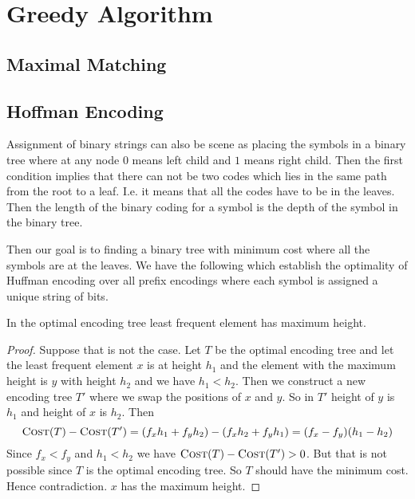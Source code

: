 \chapter{Greedy Algorithm}

\section{Maximal Matching}

\section{Hoffman Encoding}
\begin{algoprob}
\end{algoprob}

Assignment of binary strings can also be scene as placing the symbols in a binary tree where at any node $0$ means left child and $1$ means right child. Then the first condition implies that there can not be two codes which lies in the same path from the root to a leaf. I.e. it means that all the codes have to be in the leaves. Then the length of the binary coding for a symbol  is the depth of the symbol in the binary tree. 

Then our goal is to finding a binary tree with minimum cost where all the symbols are at the leaves. We have the following which establish the optimality of Huffman encoding over all prefix encodings where each symbol is assigned a unique string of bits.
\begin{lemma}{}{}
	In the optimal encoding tree  least frequent element has maximum height.
\end{lemma}
\begin{proof}
	Suppose that is not the case. Let $T$ be the optimal encoding tree and let the least frequent element $x$ is at height $h_1$ and the element with the maximum height is $y$ with height $h_2$ and we have $h_1<h_2$.  Then we construct a new encoding tree $T'$ where we swap the positions of $x$ and $y$. So in $T'$ height of $y$ is $h_1$ and height of $x$ is $h_2$. Then $$\textsc{Cost}(T)-\textsc{Cost}(T')=(f_xh_1+f_yh_2)-(f_xh_2+f_yh_1)=(f_x-f_y)(h_1-h_2)$$Since $f_x<f_y$ and $h_1<h_2$ we have $\textsc{Cost}(T)-\textsc{Cost}(T')>0$. But that is not possible since $T$ is the optimal encoding tree. So $T$ should have the minimum cost. Hence contradiction. $x$ has the maximum height.
\end{proof}

